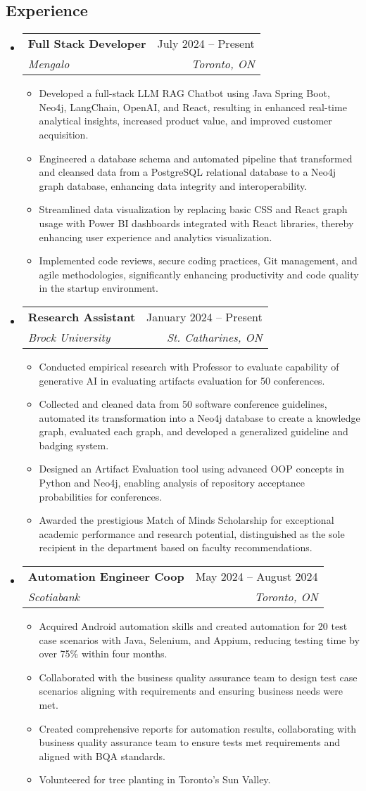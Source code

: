 \documentclass[letterpaper,11pt]{article}
\makeatletter
\newcommand{\resumeItem}[1]{
    \item\small{
            {#1 \vspace{-2pt}}
    }
}
\newcommand{\resumeSubheading}[4]{
    \vspace{-2pt}\item
    \begin{tabular*}{0.97\textwidth}[t]{l@{\extracolsep{\fill}}r}
    \textbf{#1} & #2 \\
    \textit{\small#3} & \textit{\small #4} \\
    \end{tabular*}\vspace{-7pt}
}
\newcommand{\resumeSubHeadingListStart}{\begin{itemize}[leftmargin=0.15in, label={}]}
\newcommand{\resumeSubHeadingListEnd}{\end{itemize}}
\newcommand{\resumeItemListStart}{\begin{itemize}}
\newcommand{\resumeItemListEnd}{\end{itemize}\vspace{-5pt}}
\makeatother
\begin{document}
\begin{center}

\section{Experience}

\resumeSubHeadingListStart
\resumeSubheading
{Full Stack Developer  }{July 2024 -- Present}
{Mengalo}{Toronto, ON}
\resumeItemListStart
\resumeItem{Developed a full-stack LLM RAG Chatbot using Java Spring Boot, Neo4j, LangChain, OpenAI, and React, resulting in enhanced real-time analytical insights, increased product value, and improved customer acquisition.}
\resumeItem{Engineered a database schema and automated pipeline that transformed and cleansed data from a PostgreSQL relational database to a Neo4j graph database, enhancing data integrity and interoperability.}
\resumeItem{Streamlined data visualization by replacing basic CSS and React graph usage with Power BI dashboards integrated with React libraries, thereby enhancing user experience and analytics visualization.}
\resumeItem{Implemented code reviews, secure coding practices, Git management, and agile methodologies, significantly enhancing productivity and code quality in the startup environment.}
\resumeItemListEnd
\resumeSubHeadingListEnd

\resumeSubHeadingListStart
\resumeSubheading
{Research Assistant}{January 2024 -- Present}
{Brock University}{St. Catharines, ON}
\resumeItemListStart
\resumeItem{Conducted empirical research with Professor to evaluate capability of generative AI in evaluating artifacts evaluation for 50 conferences.}
\resumeItem{Collected and cleaned data from 50 software conference guidelines, automated its transformation into a Neo4j database to create a knowledge graph, evaluated each graph, and developed a generalized guideline and badging system.}
\resumeItem {Designed an Artifact Evaluation tool using advanced OOP concepts in Python and Neo4j, enabling analysis of repository acceptance probabilities for conferences.}
\resumeItem{Awarded the prestigious Match of Minds Scholarship for exceptional academic performance and research potential, distinguished as the sole recipient in the department based on faculty recommendations.}
\resumeItemListEnd
\resumeSubHeadingListEnd

\newpage


\resumeSubHeadingListStart
\resumeSubheading
{Automation Engineer Coop}{May 2024 -- August 2024}
{Scotiabank}{Toronto, ON}
\resumeItemListStart
\resumeItem{Acquired Android automation skills and created automation for 20 test case scenarios with Java, Selenium, and Appium, reducing testing time by over 75\% within four months.}
\resumeItem{Collaborated with the business quality assurance team to design test case scenarios aligning with requirements and ensuring business needs were met.}
\resumeItem{Created comprehensive reports for automation results, collaborating with business quality assurance team to ensure tests met requirements and aligned with BQA standards.}
\resumeItem{Volunteered for tree planting in Toronto's Sun Valley.}
\resumeItemListEnd
\resumeSubHeadingListEnd


\end{center}
\end{document}
